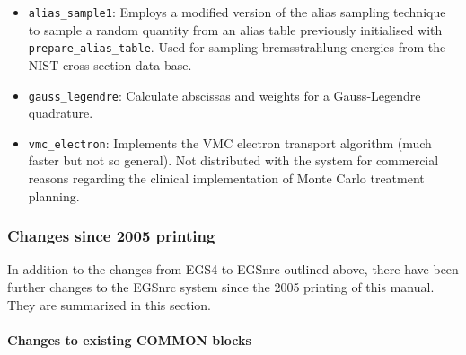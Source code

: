 \begin{itemize}
{\tt prepare\_alias\_table}: Prepares an alias sampling
table using linear interpolation between data given
in the arrays {\tt xs\_array} (abscissas) and {\tt ys\_array}
(ordinates) which both have the dimension {\tt (0:nsbin)}.
\item
{\tt alias\_sample1}: Employs a modified version of
the alias sampling technique to sample a random
quantity from an alias table previously initialised with
{\tt prepare\_alias\_table}. Used for sampling bremsstrahlung
energies from the NIST cross section data base.
\item
{\tt gauss\_legendre}: Calculate abscissas and
weights for a Gauss-Legendre quadrature.
\item
{\tt vmc\_electron}: Implements the VMC electron transport
algorithm (much faster but not so general).
Not distributed with the system for
commercial reasons regarding the clinical implementation
of Monte Carlo treatment planning.
\end{itemize}

\subsubsection{Changes since 2005 printing}

In addition to the changes from EGS4 to EGSnrc outlined above, there
have been further changes to the EGSnrc system since the 2005
printing of this manual.  They are summarized in this section.

\paragraph{Changes to existing COMMON blocks}

